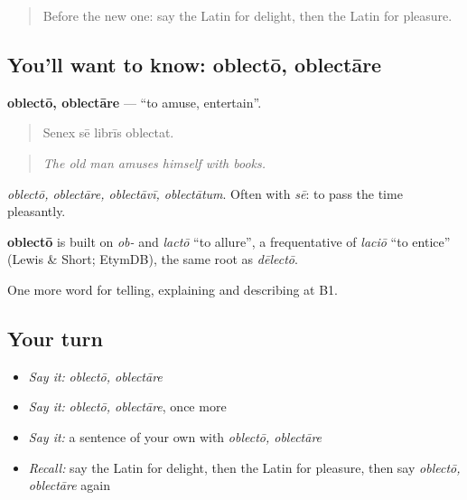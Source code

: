 \label{lesson:LA-C499-oblecto}



\begin{quote}
Before the new one: say the Latin for delight, then the Latin for pleasure.
\end{quote}

\subsection*{You'll want to know: oblectō, oblectāre}
\textbf{oblectō, oblectāre} — \textquotedblleft{}to amuse, entertain\textquotedblright{}.

\begin{quote}
Senex sē librīs oblectat.
\end{quote}

\begin{quote}
\emph{The old man amuses himself with books.}
\end{quote}

\emph{oblectō, oblectāre, oblectāvī, oblectātum}. Often with \emph{sē}: to pass the time pleasantly.

\begin{cousinweb}
\textbf{oblectō} is built on \emph{ob-} and \emph{lactō} \textquotedblleft{}to allure\textquotedblright{}, a frequentative of \emph{laciō} \textquotedblleft{}to entice\textquotedblright{} (Lewis \& Short; EtymDB), the same root as \emph{dēlectō}.
\end{cousinweb}

\begin{grammarlens}[title={What you've built}]
One more word for telling, explaining and describing at B1.
\end{grammarlens}

\subsection*{Your turn}
\begin{itemize}
\raggedright
  \item \emph{Say it:} \emph{oblectō, oblectāre}
  \item \emph{Say it:} \emph{oblectō, oblectāre}, once more
  \item \emph{Say it:} a sentence of your own with \emph{oblectō, oblectāre}
  \item \emph{Recall:} say the Latin for delight, then the Latin for pleasure, then say \emph{oblectō, oblectāre} again
\end{itemize}

